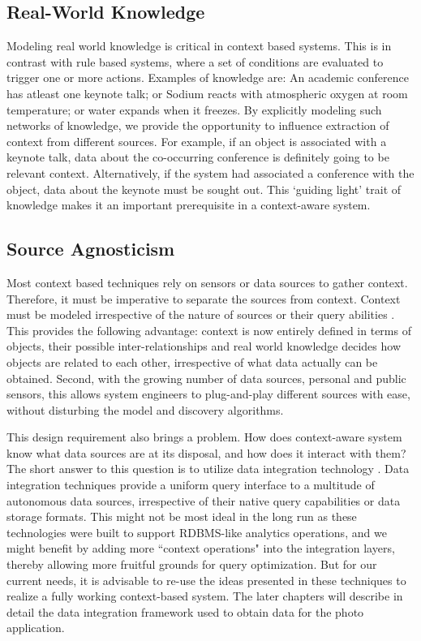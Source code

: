 \subsection{Real-World Knowledge}
Modeling real world knowledge is critical in context based systems. This is in contrast with rule based systems, where a set of conditions are evaluated to trigger one or more actions. Examples of knowledge are: An academic conference has atleast one keynote talk; or Sodium reacts with atmospheric oxygen at room temperature; or water expands when it freezes. By explicitly modeling such networks of knowledge, we provide the opportunity to influence extraction of context from different sources. For example, if an object is associated with a keynote talk, data about the co-occurring conference is definitely going to be relevant context. Alternatively, if the system had associated a conference with the object, data about the keynote must be sought out. This `guiding light' trait of knowledge makes it an important prerequisite in a context-aware system.

\subsection{Source Agnosticism}
Most context based techniques rely on sensors or data sources to gather context. Therefore, it must be imperative to separate the sources from context. Context must be modeled irrespective of the nature of sources or their query abilities \cite{yerneni1999computing}. This provides the following advantage: context is now entirely defined in terms of objects, their possible inter-relationships and real world knowledge decides how objects are related to each other, irrespective of what data actually can be obtained. Second, with the growing number of data sources, personal and public sensors, this allows system engineers to plug-and-play different sources with ease, without disturbing the model and discovery algorithms.

This design requirement also brings a problem. How does context-aware system know what data sources are at its disposal, and how does it interact with them? The short answer to this question is to utilize data integration technology \cite{doan2005semantic, halevy2001answering, lenzerini2002data}. Data integration techniques provide a uniform query interface to a multitude of autonomous data sources, irrespective of their native query capabilities or data storage formats. This might not be most ideal in the long run as these technologies were built to support RDBMS-like analytics operations, and we might benefit by adding more ``context operations" into the integration layers, thereby allowing more fruitful grounds for query optimization. But for our current needs, it is advisable to re-use the ideas presented in these techniques to realize a fully working context-based system. The later chapters will describe in detail the data integration framework used to obtain data for the photo application.

